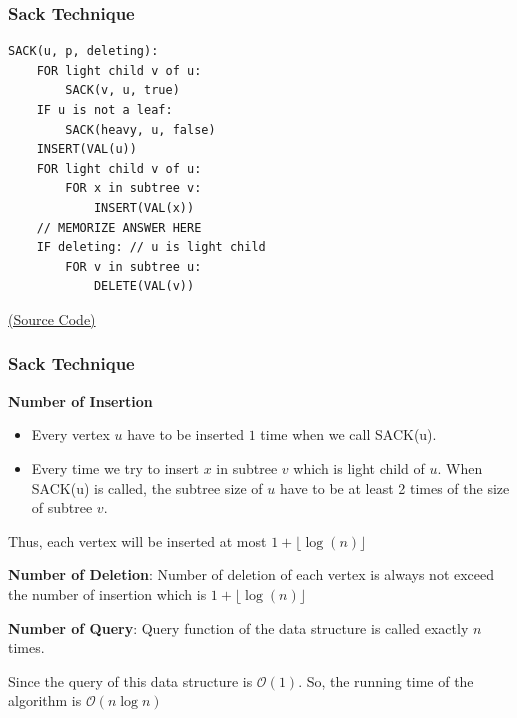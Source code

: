 \begin{frame}[fragile]
\frametitle{Sack Technique}  

\begin{small}
\begin{verbatim}
SACK(u, p, deleting):
    FOR light child v of u:
        SACK(v, u, true)
    IF u is not a leaf:
        SACK(heavy, u, false) 
    INSERT(VAL(u))
    FOR light child v of u:
        FOR x in subtree v:
            INSERT(VAL(x))
    // MEMORIZE ANSWER HERE
    IF deleting: // u is light child
        FOR v in subtree u:
            DELETE(VAL(v))
\end{verbatim}
\end{small}

\vfill

\href{https://gist.github.com/MasterIceZ/a3d830109208088d93a5a0f788014e18}{(Source Code)}
    
\end{frame}

\begin{frame}
\frametitle{Sack Technique}  

\textbf{Number of Insertion}

\begin{itemize}
    \item Every vertex $u$ have to be inserted $1$ time when we call SACK(u).
    
    \item Every time we try to insert $x$ in subtree $v$ which is light child of $u$. When SACK(u) is called, the subtree size of $u$ have to be at least 2 times of the size of subtree $v$.
\end{itemize}

Thus, each vertex will be inserted at most $1 + \lfloor \log(n) \rfloor$

\textbf{Number of Deletion}:
Number of deletion of each vertex is always not exceed the number of insertion which is $1 + \lfloor \log(n) \rfloor$

\textbf{Number of Query}:
Query function of the data structure is called exactly $n$ times.

Since the query of this data structure is $\mathcal{O}(1)$. So, the running time of the algorithm is $\mathcal{O}(n\log{n})$

\end{frame}